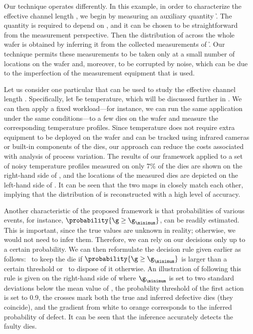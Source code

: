 Our technique operates differently. In this example, in order to characterize
the effective channel length \g, we begin by measuring an auxiliary quantity \h.
The quantity is required to depend on \g, and it can be chosen to be
straightforward from the measurement perspective. Then the distribution of \g
across the whole wafer is obtained by inferring it from the collected
measurements of \h. Our technique permits these measurements to be taken only at
a small number of locations on the wafer and, moreover, to be corrupted by
noise, which can be due to the imperfection of the measurement equipment that is
used.

Let us consider one particular \h that can be used to study the effective
channel length \g. Specifically, let \h be temperature, which will be discussed
further in . We can then apply a fixed workload---for
instance, we can run the same application under the same conditions---to a few
dies on the wafer and measure the corresponding temperature profiles. Since
temperature does not require extra equipment to be deployed on the wafer and can
be tracked using infrared cameras \cite{mesa-martinez2007} or built-in
components of the dies, our approach can reduce the costs associated with
analysis of process variation. The results of our framework applied to a set of
noisy temperature profiles measured on only 7\% of the dies are shown on the
right-hand side of , and the locations of
the measured dies are depicted on the left-hand side of
. It can be seen that the two maps in
 closely match each other, implying that the
distribution of \g is reconstructed with a high level of accuracy.

Another characteristic of the proposed framework is that probabilities of
various events, for instance, $\probability{\g \geq \g_\minimum}$, can be
readily estimated. This is important, since the true values are unknown in
reality; otherwise, we would not need to infer them. Therefore, we can rely on
our decisions only up to a certain probability. We can then reformulate the
decision rule given earlier as follows: \one~to keep the die if $\probability{\g
\geq \g_\minimum}$ is larger than a certain threshold or \two~to dispose of it
otherwise. An illustration of following this rule is given on the right-hand
side of  where $\g_\minimum$ is set to two
standard deviations below the mean value of \g, the probability threshold of the
first action is set to 0.9, the crosses mark both the true and inferred
defective dies (they coincide), and the gradient from white to orange
corresponds to the inferred probability of defect. It can be seen that the
inference accurately detects the faulty dies.

